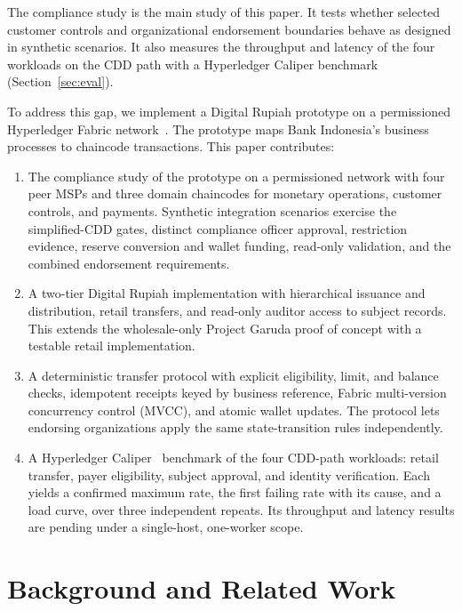 \documentclass[conference]{IEEEtran}
\begin{document}
The compliance study is the main study of this paper. It tests whether selected
customer controls and organizational endorsement boundaries behave as designed
in synthetic scenarios. It also measures the throughput and latency of the four
workloads on the CDD path with a Hyperledger Caliper benchmark (Section~\ref{sec:eval}).

To address this gap, we implement a Digital Rupiah prototype on a permissioned
Hyperledger Fabric network~\cite{androulaki2018}. The prototype maps Bank
Indonesia's business processes to chaincode transactions. This paper contributes:
\begin{enumerate}
	\item The compliance study of the prototype on a permissioned network with
	      four peer MSPs and three domain chaincodes for monetary operations,
	      customer controls, and payments. Synthetic integration scenarios
	      exercise the simplified-CDD gates, distinct compliance officer approval, restriction evidence, reserve
	      conversion and wallet funding, read-only validation, and the combined endorsement
	      requirements.
	\item A two-tier Digital Rupiah implementation with hierarchical issuance and
	      distribution, retail transfers, and read-only auditor access to subject
	      records. This extends the wholesale-only Project Garuda proof of concept with a
	      testable retail implementation.
	\item A deterministic transfer protocol with explicit eligibility, limit, and
	      balance checks, idempotent receipts keyed by business reference, Fabric
	      multi-version concurrency control (MVCC), and atomic wallet updates. The
	      protocol lets endorsing organizations apply the same state-transition
	      rules independently.
	\item A Hyperledger Caliper~\cite{hlf_caliper} benchmark of the four CDD-path
	      workloads: retail transfer, payer eligibility, subject approval, and identity
	      verification. Each yields a confirmed maximum rate, the first failing rate
	      with its cause, and a load curve, over three independent repeats. Its
	      throughput and latency results are pending under a single-host, one-worker scope.
\end{enumerate}

\section{Background and Related Work}
\end{document}
